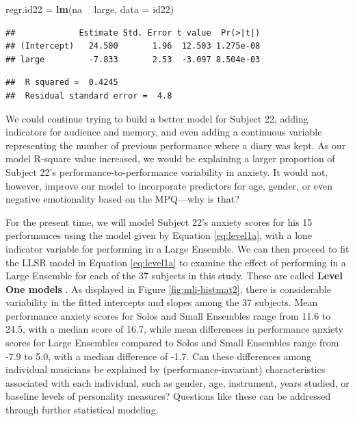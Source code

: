 \documentclass[
]{krantz}
\newenvironment{Shaded}{\begin{snugshade}}{\end{snugshade}}
\newcommand{\DataTypeTok}[1]{\textcolor[rgb]{0.27,0.27,0.27}{#1}}
\newcommand{\KeywordTok}[1]{\textcolor[rgb]{0.27,0.27,0.27}{\textbf{#1}}}
\newcommand{\NormalTok}[1]{#1}
\newcommand{\OperatorTok}[1]{\textcolor[rgb]{0.43,0.43,0.43}{\textbf{#1}}}
\newcommand{\StringTok}[1]{\textcolor[rgb]{0.5,0.5,0.5}{#1}}
\begin{document}
\begin{Shaded}
\begin{Highlighting}[]
\NormalTok{regr.id22 =}\StringTok{ }\KeywordTok{lm}\NormalTok{(na }\OperatorTok{~}\StringTok{ }\NormalTok{large, }\DataTypeTok{data =}\NormalTok{ id22)}
\end{Highlighting}
\end{Shaded}

\begin{verbatim}
##             Estimate Std. Error t value  Pr(>|t|)
## (Intercept)   24.500       1.96  12.503 1.275e-08
## large         -7.833       2.53  -3.097 8.504e-03
\end{verbatim}

\begin{verbatim}
##  R squared =  0.4245 
##  Residual standard error =  4.8
\end{verbatim}

We could continue trying to build a better model for Subject 22, adding indicators for audience and memory, and even adding a continuous variable representing the number of previous performance where a diary was kept. As our model R-square value increased, we would be explaining a larger proportion of Subject 22's performance-to-performance variability in anxiety. It would not, however, improve our model to incorporate predictors for age, gender, or even negative emotionality based on the MPQ---why is that?

For the present time, we will model Subject 22's anxiety scores for his 15 performances using the model given by Equation \eqref{eq:level1a}, with a lone indicator variable for performing in a Large Ensemble. We can then proceed to fit the LLSR model in Equation \eqref{eq:level1a} to examine the effect of performing in a Large Ensemble for each of the 37 subjects in this study. These are called \textbf{Level One models} . As displayed in Figure \ref{fig:mli-histmat2}, there is considerable variability in the fitted intercepts and slopes among the 37 subjects. Mean performance anxiety scores for Solos and Small Ensembles range from 11.6 to 24.5, with a median score of 16.7, while mean differences in performance anxiety scores for Large Ensembles compared to Solos and Small Ensembles range from -7.9 to 5.0, with a median difference of -1.7. Can these differences among individual musicians be explained by (performance-invariant) characteristics associated with each individual, such as gender, age, instrument, years studied, or baseline levels of personality measures? Questions like these can be addressed through further statistical modeling.
\end{document}
